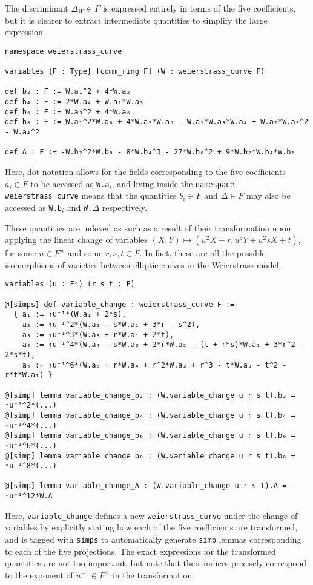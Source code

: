 \documentclass[a4paper,UKenglish,cleveref,autoref,thm-restate]{lipics-v2021}
\begin{document}
The discriminant $ \Delta_W \in F $ is expressed entirely in terms of the five coefficients, but it is clearer to extract intermediate quantities \cite[Section III.1]{silverman} to simplify the large expression.
\begin{lstlisting}
namespace weierstrass_curve

variables {F : Type} [comm_ring F] (W : weierstrass_curve F)

def b₂ : F := W.a₁^2 + 4*W.a₂
def b₄ : F := 2*W.a₄ + W.a₁*W.a₃
def b₆ : F := W.a₃^2 + 4*W.a₆
def b₈ : F := W.a₁^2*W.a₆ + 4*W.a₂*W.a₆ - W.a₁*W.a₃*W.a₄ + W.a₂*W.a₃^2 - W.a₄^2

def Δ : F := -W.b₂^2*W.b₈ - 8*W.b₄^3 - 27*W.b₆^2 + 9*W.b₂*W.b₄*W.b₆
\end{lstlisting}
Here, dot notation allows for the fields corresponding to the five coefficients $ a_i \in F $ to be accessed as \texttt{W.a\ensuremath{_i}}, and living inside the \texttt{namespace weierstrass\_curve} means that the quantities $ b_i \in F $ and $ \Delta \in F $ may also be accessed as \texttt{W.b\ensuremath{_i}} and \texttt{W.\ensuremath{\Delta}} respectively.

These quantities are indexed as such as a result of their transformation upon applying the linear change of variables $ (X, Y) \mapsto (u^2X + r, u^3Y + u^2sX + t) $, for some $ u \in F^\times $ and some $ r, s, t \in F $. In fact, these are all the possible isomorphisms of varieties between elliptic curves in the Weierstrass model \cite[Proposition III.3.1]{silverman}.
\begin{lstlisting}
variables (u : Fˣ) (r s t : F)

@[simps] def variable_change : weierstrass_curve F :=
  { a₁ := ↑u⁻¹*(W.a₁ + 2*s),
    a₂ := ↑u⁻¹^2*(W.a₂ - s*W.a₁ + 3*r - s^2),
    a₃ := ↑u⁻¹^3*(W.a₃ + r*W.a₁ + 2*t),
    a₄ := ↑u⁻¹^4*(W.a₄ - s*W.a₃ + 2*r*W.a₂ - (t + r*s)*W.a₁ + 3*r^2 - 2*s*t),
    a₆ := ↑u⁻¹^6*(W.a₆ + r*W.a₄ + r^2*W.a₂ + r^3 - t*W.a₃ - t^2 - r*t*W.a₁) }

@[simp] lemma variable_change_b₂ : (W.variable_change u r s t).b₂ = ↑u⁻¹^2*(...)
@[simp] lemma variable_change_b₄ : (W.variable_change u r s t).b₄ = ↑u⁻¹^4*(...)
@[simp] lemma variable_change_b₆ : (W.variable_change u r s t).b₆ = ↑u⁻¹^6*(...)
@[simp] lemma variable_change_b₈ : (W.variable_change u r s t).b₈ = ↑u⁻¹^8*(...)

@[simp] lemma variable_change_Δ : (W.variable_change u r s t).Δ = ↑u⁻¹^12*W.Δ
\end{lstlisting}
Here, \texttt{variable\_change} defines a new \texttt{weierstrass\_curve} under the change of variables by explicitly stating how each of the five coefficients are transformed, and is tagged with \texttt{simps} to automatically generate \texttt{simp} lemmas corresponding to each of the five projections. The exact expressions for the transformed quantities are not too important, but note that their indices precisely correspond to the exponent of $ u^{-1} \in F^\times $ in the transformation.
\end{document}
